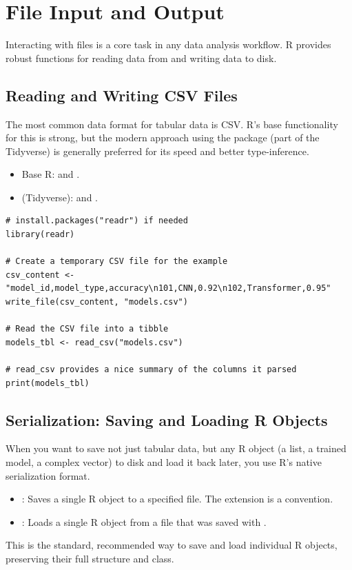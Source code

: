 \section{File Input and Output}
\label{sec:r_files}
Interacting with files is a core task in any data analysis workflow. R provides robust functions for reading data from and writing data to disk.

\subsection*{Reading and Writing CSV Files}
The most common data format for tabular data is CSV. R's base functionality for this is strong, but the modern approach using the  package (part of the Tidyverse) is generally preferred for its speed and better type-inference.
\begin{itemize}
    \item Base R:  and .
    \item {} (Tidyverse):  and .
\end{itemize}

\begin{example}
\text{ }\begin{verbatim}
# install.packages("readr") if needed
library(readr)

# Create a temporary CSV file for the example
csv_content <- "model_id,model_type,accuracy\n101,CNN,0.92\n102,Transformer,0.95"
write_file(csv_content, "models.csv")

# Read the CSV file into a tibble
models_tbl <- read_csv("models.csv")

# read_csv provides a nice summary of the columns it parsed
print(models_tbl)
\end{verbatim}
\end{example}

\subsection*{Serialization: Saving and Loading R Objects}
When you want to save not just tabular data, but any R object (a list, a trained model, a complex vector) to disk and load it back later, you use R's native serialization format.
\begin{itemize}
    \item \textbf{}: Saves a single R object to a specified file. The  extension is a convention.
    \item \textbf{}: Loads a single R object from a file that was saved with .
\end{itemize}
This is the standard, recommended way to save and load individual R objects, preserving their full structure and class.

